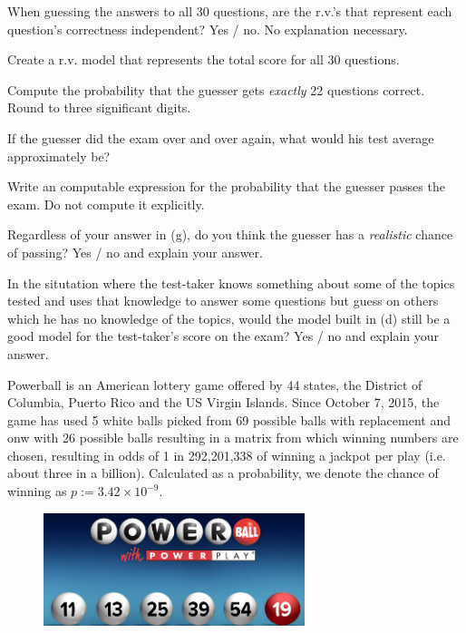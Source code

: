 \documentclass[12pt]{article}
\begin{document}
 When guessing the answers to all 30 questions, are the r.v.'s that represent each question's correctness independent? Yes / no. No explanation necessary.  

 Create a r.v. model that represents the total score for all 30 questions.  

 Compute the probability that the guesser gets \textit{exactly} 22 questions correct. Round to three significant digits.  

 If the guesser did the exam over and over again, what would his test average approximately be? 

 Write an computable expression for the probability that the guesser passes the exam. Do not compute it explicitly.  

 Regardless of your answer in (g), do you think the guesser has a \textit{realistic} chance of passing? Yes / no and explain your answer. 

 In the situtation where the test-taker knows something about some of the topics tested and uses that knowledge to answer some questions but guess on others which he has no knowledge of the topics, would the model built in (d) still be a good model for the test-taker's score on the exam? Yes / no and explain your answer. 

\eenum


\problem Powerball is an American lottery game offered by 44 states, the District of Columbia, Puerto Rico and the US Virgin Islands. Since October 7, 2015, the game has used 5 white balls picked from 69 possible balls with replacement and onw  with 26 possible balls resulting in a matrix from which winning numbers are chosen, resulting in odds of 1 in 292,201,338 of winning a jackpot per play (i.e. about three in a billion). Calculated as a probability, we denote the chance of winning as $p := 3.42 \times 10^{-9}$. \\

\begin{figure}[htp]
\centering
\includegraphics[width=3in]{powerball.png}
\end{figure}
\end{document}
